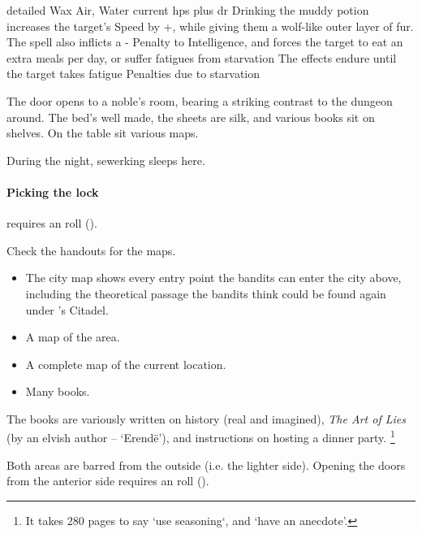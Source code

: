 \showTalisman

  {detailed}%
  {Wax}%
  {Air, Water}%
  {current \glspl{hp} plus \gls{dr}}%
  {Drinking the muddy potion increases the target's Speed by +, while giving them a wolf-like outer layer of fur.
  The spell also inflicts a - Penalty to Intelligence, and forces the target to eat an extra  meals per day, or suffer \glspl{fatigue} from starvation}%
  {
  The effects endure until the target takes \gls{fatigue} Penalties due to starvation}%
\showTalisman

\begin{boxtext}
  The door opens to a noble's room, bearing a striking contrast to the dungeon around.  The bed's well made, the sheets are silk, and various books sit on shelves.
  On the table sit various maps.
\end{boxtext}

\label{sewerKingRoom}

During the night, \gls{sewerking} sleeps here.

\paragraph{Picking the lock}
requires an  roll (\tn[9]).

Check the handouts for the maps.

\begin{itemize}
  \item
  The city map shows every entry point the bandits can enter the city above, including the theoretical passage the bandits think could be found again under 's Citadel.
  \item
  A map of the area.
  \item
  A complete map of the current location.
  \item
  Many books.
\end{itemize}

The books are variously written on history (real and imagined), \textit{The Art of Lies} (by an elvish author -- `Erend\"e'), and instructions on hosting a dinner party.%
\footnote{It takes 280 pages to say `use seasoning`, and `have an anecdote'.}


Both areas are barred from the outside (i.e. the lighter side).
Opening the doors from the anterior side requires an  roll (\tn[10]).

